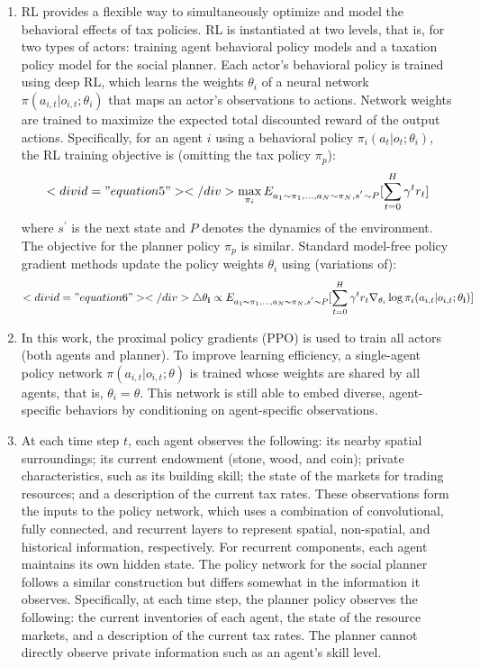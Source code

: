 \documentclass{article}
\begin{document}
\begin{enumerate}
\item RL provides a flexible way to simultaneously optimize and model the behavioral effects of tax policies. RL is instantiated at two levels, that is, for two types of actors: training agent behavioral policy models and a taxation policy model for the social planner. Each actor’s behavioral policy is trained using deep RL, which learns the weights \( \theta_{i} \) of a neural network \( \pi(a_{i, t} | o_{i, t}; \theta_{i}) \) that maps an actor’s observations to actions. Network weights are trained to maximize the expected total discounted reward of the output actions. Specifically, for an agent \( i \) using a behavioral policy \( \pi_{i}(a_{t} | o_{t}; \theta_{i}) \), the RL training objective is (omitting the tax policy \( \pi_{p} \)):
\begin{equation}<div id="equation5"></div>

\max_{\pi_{i}} E_{a_{1} \sim \pi_{1}, ..., a_{N} \sim \pi_{N}, s^{'} \sim P} [\sum^{H}_{t = 0} \gamma^{t} r_{t}]
\end{equation}
where \( s^{'} \) is the next state and \( P \) denotes the dynamics of the environment. The objective for the planner policy \( \pi_{p} \) is similar. Standard model-free policy gradient methods update the policy weights \( \theta_{i} \) using (variations of):
\begin{equation}<div id="equation6"></div>

\mathbf{\triangle \theta_{i}} \propto E_{{a_{1} \sim \pi_{1}, ..., a_{N} \sim \pi_{N}, s^{'} \sim P}}[\sum^{H}_{t = 0} \gamma^{t} r_{t} \nabla_{\theta_{i}} \log \pi_{i}(a_{i, t} | o_{i, t}; \mathbf{\theta_{i}})]
\end{equation}

\item In this work, the proximal policy gradients (PPO) is used to train all actors (both agents and planner). To improve learning efficiency, a single-agent policy network \( \pi(a_{i, t} | o_{i, t}; \theta) \) is trained whose weights are shared by all agents, that is, \( \theta_{i} = \theta \). This network is still able to embed diverse, agent-specific behaviors by conditioning on agent-specific observations.

\item At each time step \( t \), each agent observes the following: its nearby spatial surroundings; its current endowment (stone, wood, and coin); private characteristics, such as its building skill; the state of the markets for trading resources; and a description of the current tax rates. These observations form the inputs to the policy network, which uses a combination of convolutional, fully connected, and recurrent layers to represent spatial, non-spatial, and historical information, respectively. For recurrent components, each agent maintains its own hidden state. The policy network for the social planner follows a similar construction but differs somewhat in the information it observes. Specifically, at each time step, the planner policy observes the following: the current inventories of each agent, the state of the resource markets, and a description of the current tax rates. The planner cannot directly observe private information such as an agent’s skill level.


\end{enumerate}
\end{document}
